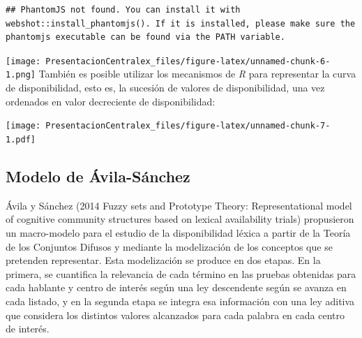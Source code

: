 \documentclass[
]{article}
\newenvironment{Shaded}{\begin{snugshade}}{\end{snugshade}}
\newcommand{\DataTypeTok}[1]{\textcolor[rgb]{0.13,0.29,0.53}{#1}}
\newcommand{\KeywordTok}[1]{\textcolor[rgb]{0.13,0.29,0.53}{\textbf{#1}}}
\newcommand{\NormalTok}[1]{#1}
\newcommand{\OperatorTok}[1]{\textcolor[rgb]{0.81,0.36,0.00}{\textbf{#1}}}
\newcommand{\StringTok}[1]{\textcolor[rgb]{0.31,0.60,0.02}{#1}}
\begin{document}
\begin{verbatim}
## PhantomJS not found. You can install it with webshot::install_phantomjs(). If it is installed, please make sure the phantomjs executable can be found via the PATH variable.
\end{verbatim}

\texttt{[image: PresentacionCentralex\_files/figure-latex/unnamed-chunk-6-1.png]}
También es posible utilizar los mecanismos de \emph{R} para representar
la curva de disponibilidad, esto es, la sucesión de valores de
disponibilidad, una vez ordenados en valor decreciente de
disponibilidad:

\begin{Shaded}
\end{Shaded}

\texttt{[image: PresentacionCentralex\_files/figure-latex/unnamed-chunk-7-1.pdf]}

\hypertarget{modelo-de-uxe1vila-suxe1nchez}{%
\subsection{Modelo de
Ávila-Sánchez}\label{modelo-de-uxe1vila-suxe1nchez}}

Ávila y Sánchez (2014 Fuzzy sets and Prototype Theory: Representational
model of cognitive community structures based on lexical availability
trials) propusieron un macro-modelo para el estudio de la disponibilidad
léxica a partir de la Teoría de los Conjuntos Difusos y mediante la
modelización de los conceptos que se pretenden representar. Esta
modelización se produce en dos etapas. En la primera, se cuantifica la
relevancia de cada término en las pruebas obtenidas para cada hablante y
centro de interés según una ley descendente según se avanza en cada
listado, y en la segunda etapa se integra esa información con una ley
aditiva que considera los distintos valores alcanzados para cada palabra
en cada centro de interés.
\end{document}
